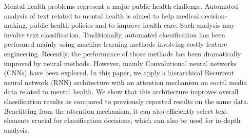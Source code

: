 Mental health problems represent a major public health challenge.  Automated analysis of text related to mental health is aimed to help medical decision-making, public health policies and to improve health care. Such analysis may involve text classification. Traditionally, automated classification has been performed mainly using machine learning methods involving costly feature engineering. Recently, the performance of those methods has been dramatically improved by neural methods. However, mainly Convolutional neural networks (CNNs) have been explored. In this paper, we apply a hierarchical Recurrent neural network (RNN) architecture with an attention mechanism on social media data related to mental health. We show that this architecture improves overall classification results as compared to previously reported results on the same data. Benefitting from the attention mechanism, it can also efficiently select text elements crucial for classification decisions, which can also be used for in-depth analysis.
